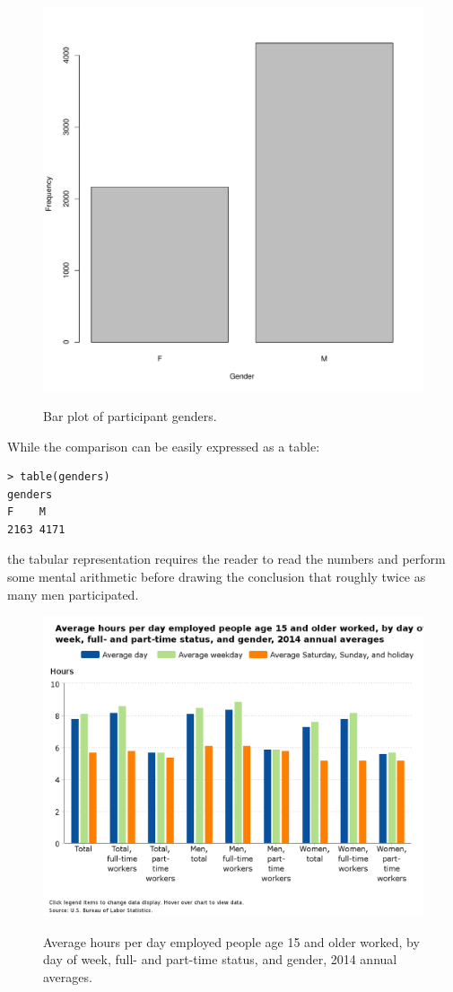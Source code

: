 \documentclass{tufte-book} %
\begin{document}
\begin{figure}
	\centering
	\includegraphics{graphics/barplot-genders}
	\label{img:barplot-genders}
	\caption{Bar plot of participant genders.}
\end{figure}

While the comparison can be easily expressed as a table: 

\begin{Verbatim}
> table(genders)
genders
F    M 
2163 4171 
\end{Verbatim}

the tabular representation requires the reader to read the numbers and perform some mental arithmetic before drawing the conclusion that roughly twice as many men participated.

\begin{figure}
	\centering
	\includegraphics{graphics/average-hours-worked}
	\label{img:average-hours-worked}
	\caption{Average hours per day employed people age 15 and older worked, by day of week, full- and part-time status, and gender, 2014 annual averages.}
\end{figure}
\end{document}
